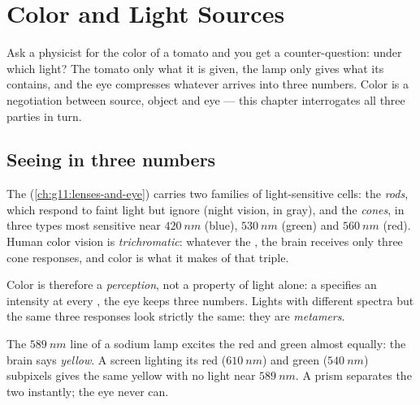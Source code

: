 \chapter{Color and Light Sources}\label{ch:g11:color-light-sources}

Ask a physicist for the color of a tomato and you get a counter-question:
under which light? The tomato only  what it is given, the lamp
only gives what its  contains, and the eye compresses whatever
arrives into three numbers. Color is a negotiation between source,
object and eye --- this chapter interrogates all three parties in turn.

\section{Seeing in three numbers}

\begin{definition}\label{def:g11:color-light-sources:cones}
The  (\cref{ch:g11:lenses-and-eye}) carries two families of
light-sensitive cells: the \emph{rods}, which respond to
faint light but ignore  (night vision, in gray), and the
\emph{cones}, in three types most sensitive near
$\qty{420}{nm}$ (blue), $\qty{530}{nm}$ (green) and $\qty{560}{nm}$
(red). Human color vision is
\emph{trichromatic}: whatever the ,
the brain receives only three cone responses, and color is what it
makes of that triple.
\end{definition}

\begin{definition}\label{def:g11:color-light-sources:perception}
Color is therefore a \emph{perception}, not a property of light alone:
a  specifies an intensity at every , the eye keeps
three numbers. Lights with different spectra but the same three 
responses look strictly the same: they are \emph{metamers}.
\end{definition}

\begin{example}\label{ex:g11:color-light-sources:yellows}
The $\qty{589}{nm}$ line of a sodium lamp excites the red and green
 almost equally: the brain says \emph{yellow}. A screen lighting
its red ($\qty{610}{nm}$) and green ($\qty{540}{nm}$) subpixels gives
the same yellow with no light near $\qty{589}{nm}$. A prism separates
the two instantly; the eye never can.
\end{example}


